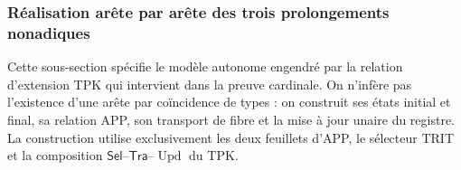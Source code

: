 \subsubsection{Réalisation arête par arête des trois prolongements nonadiques}
\label{hmtfg:subsubsec:tres-vueltas-ext-ch}

Cette sous-section spécifie le modèle autonome engendré par la relation
d’extension TPK qui intervient dans la preuve cardinale. On n’infère pas l’existence
d’une arête par coïncidence de types : on construit ses états initial et final,
sa relation APP, son transport de fibre et la mise à jour unaire du registre.
La construction utilise exclusivement les deux feuillets d’APP, le sélecteur TRIT
et la composition \(\mathsf{Sel}\)--\(\mathsf{Tra}\)--\(\operatorname{Upd}\) du TPK.

